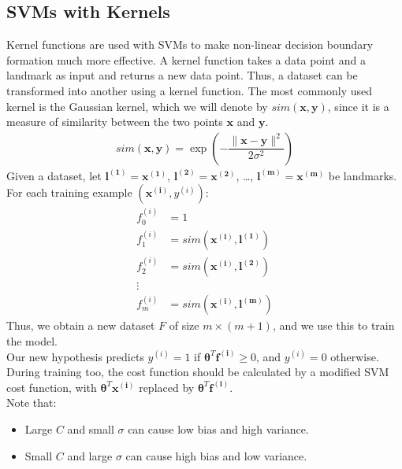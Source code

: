 \documentclass[a4paper, 12pt]{article}
\begin{document}
\subsection{SVMs with Kernels}
Kernel functions are used with SVMs to make non-linear decision boundary formation much more effective. A kernel function takes a data point and a landmark as input and returns a new data point. Thus, a dataset can be transformed into another using a kernel function. The most commonly used kernel is the Gaussian kernel, which we will denote by $sim\left(\bm{x}, \bm{y}\right)$, since it is a measure of similarity between the two points $\bm{x}$ and $\bm{y}$.
\begin{align*}
sim\left(\bm{x}, \bm{y}\right) = \exp\left(-\dfrac{\lVert \bm{x}-\bm{y} \rVert^2}{2\sigma^2}\right)
\end{align*}
Given a dataset, let $\bm{l^{(1)}} = \bm{x^{(1)}}$, $\bm{l^{(2)}} = \bm{x^{(2)}}$, \dots, $\bm{l^{(m)}} = \bm{x^{(m)}}$ be landmarks. \\
For each training example $\left(\bm{x^{\left(i\right)}}, y^{\left(i\right)}\right)$:
\begin{align*}
f_0^{\left(i\right)} &= 1 \\
f_1^{\left(i\right)} &= sim\left(\bm{x^{\left(i\right)}}, \bm{l^{\left(1\right)}}\right) \\
f_2^{\left(i\right)} &= sim\left(\bm{x^{\left(i\right)}}, \bm{l^{\left(2\right)}}\right) \\
\vdots & \\
f_m^{\left(i\right)} &= sim\left(\bm{x^{\left(i\right)}}, \bm{l^{\left(m\right)}}\right)
\end{align*}
Thus, we obtain a new dataset $F$ of size $m\times(m+1)$, and we use this to train the model. \\
Our new hypothesis predicts $y^{\left(i\right)} = 1$ if $\bm{\theta}^T\bm{f^{\left(i\right)}} \geq 0$, and $y^{\left(i\right)} = 0$ otherwise. \\
During training too, the cost function should be calculated by a modified SVM cost function, with $\bm{\theta}^T\bm{x^{\left(i\right)}}$ replaced by $\bm{\theta}^T\bm{f^{\left(i\right)}}$. \\
\break
Note that:
\begin{itemize}
\item Large $C$ and small $\sigma$ can cause low bias and high variance.
\item Small $C$ and large $\sigma$ can cause high bias and low variance.
\end{itemize}
\end{document}
